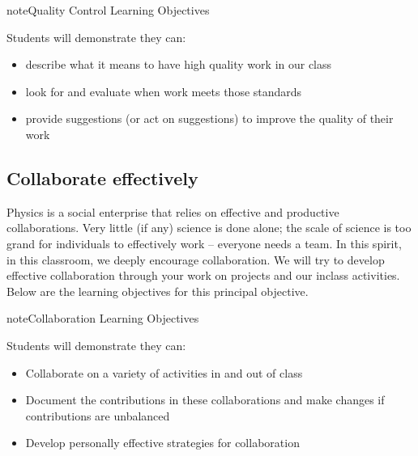 \documentclass[letterpaper,10pt,english]{jupyterBook}
\begin{document}
\begin{sphinxadmonition}{note}{Quality Control Learning Objectives}

\sphinxAtStartPar
Students will demonstrate they can:
\begin{itemize}
\item {} 
\sphinxAtStartPar
describe what it means to have high quality work in our class

\item {} 
\sphinxAtStartPar
look for and evaluate when work meets those standards

\item {} 
\sphinxAtStartPar
provide suggestions (or act on suggestions) to improve the quality of their work

\end{itemize}
\end{sphinxadmonition}


\subsection{Collaborate effectively}
\label{\detokenize{content/0_course/goals:collaborate-effectively}}
\sphinxAtStartPar
Physics is a social enterprise that relies on effective and productive collaborations. Very little (if any) science is done alone; the scale of science is too grand for individuals to effectively work – everyone needs a team. In this spirit, in this classroom, we deeply encourage collaboration. We will try to develop effective collaboration through your work on projects and our in\sphinxhyphen{}class activities. Below are the learning objectives for this principal objective.

\begin{sphinxadmonition}{note}{Collaboration Learning Objectives}

\sphinxAtStartPar
Students will demonstrate they can:
\begin{itemize}
\item {} 
\sphinxAtStartPar
Collaborate on a variety of activities in and out of class

\item {} 
\sphinxAtStartPar
Document the contributions in these collaborations and make changes if contributions are unbalanced

\item {} 
\sphinxAtStartPar
Develop personally effective strategies for collaboration

\end{itemize}
\end{sphinxadmonition}
\end{document}
